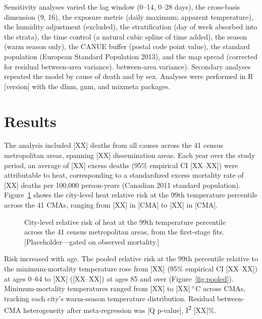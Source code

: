 \documentclass[12pt]{article}
\begin{document}
Sensitivity analyses varied the lag window (0--14, 0--28 days),
the cross-basis dimension (9, 16), the exposure metric (daily
maximum; apparent temperature), the humidity adjustment
(excluded), the stratification (day of week absorbed into the
strata), the time control (a natural cubic spline of time
added), the season (warm season only), the CANUE buffer (postal
code point value), the standard population (European Standard
Population 2013), and the map spread (corrected for residual
between-area variance). between-area variance). Secondary analyses repeated the model by
cause of death and by sex. Analyses were performed in R
[version] with the dlnm, gnm, and mixmeta packages.
\section{Results} %

The analysis included [XX] deaths from all causes across the 41
census metropolitan areas, spanning [XX] dissemination areas.
Each year over the study period, an average of [XX] excess deaths
(95\% empirical CI [XX--XX]) were attributable to heat,
corresponding to a standardized excess mortality rate of [XX]
deaths per 100,000 person-years (Canadian 2011 standard
population). Figure~\ref{fig:cities} shows the city-level heat
relative risk at the 99th temperature percentile across the 41
CMAs, ranging from [XX] in [CMA] to [XX] in [CMA].

\begin{figure}[H]
\centering
\caption{City-level relative risk of heat at the 99th temperature
percentile across the 41 census metropolitan areas, from the
first-stage fits. [Placeholder---gated on observed mortality.]}
\label{fig:cities}
\end{figure}

Risk increased with age. The pooled relative risk at the 99th
percentile relative to the minimum-mortality temperature rose
from [XX] (95\% empirical CI [XX--XX]) at ages 0--64 to [XX]
([XX--XX]) at ages 85 and over (Figure~\ref{fig:pooled}).
Minimum-mortality temperatures ranged from [XX] to
[XX]$\,\degree$C across CMAs, tracking each city's warm-season
temperature distribution. Residual between-CMA heterogeneity
after meta-regression was [Q p-value], I\textsuperscript{2}
[XX]\%.
\end{document}
